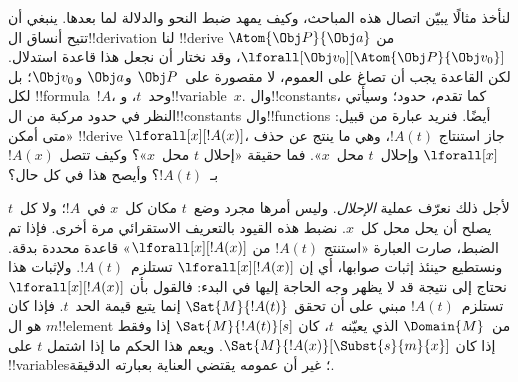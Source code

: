 \documentclass[../../../include/open-logic-section]{subfiles}
\begin{document}


لنأخذ مثالًا يبيّن اتصال هذه المباحث، وكيف يمهد ضبط النحو والدلالة
لما بعدها. ينبغي أن تتيح أنساق ال!!{derivation} لنا
!!{derive} $\Atom{\Obj P}{\Obj a}$ من
$\lforall[\Obj v_0][\Atom{\Obj P}{\Obj v_0}]$، وقد نختار أن
نجعل هذا قاعدة استدلال. لكن القاعدة يجب أن تصاغ على العموم،
لا مقصورة على~$\Obj P$ و$\Obj a$ و$\Obj v_0$؛ بل لكل
!!{formula}~$!A$، وحد~$t$، و!!{variable}~$x$. وال!!{constant}s،
كما تقدم، حدود؛ وسيأتي النظر في حدود مركبة من
ال!!{constant}s وال!!{function}s أيضًا. فنريد عبارة من قبيل:
«متى أمكن !!{derive} $\lforall[x][!A(x)]$، جاز استنتاج
$!A(t)$، وهي ما ينتج عن حذف $\lforall[x]$ وإحلال~$t$
محل~$x$». فما حقيقة «إحلال $t$ محل~$x$»؟ وكيف تتصل
$!A(x)$ بـ~$!A(t)$؟ وأيصح هذا في كل حال؟

لأجل ذلك نعرّف عملية \emph{الإحلال}. وليس أمرها مجرد وضع~$t$
مكان كل~$x$ في~$!A$؛ ولا كل~$t$ يصلح أن يحل محل كل~$x$.
نضبط هذه القيود بالتعريف الاستقرائي مرة أخرى. فإذا تم الضبط،
صارت العبارة «استنتج $!A(t)$ من $\lforall[x][!A(x)]$» قاعدة
محددة بدقة. ونستطيع حينئذ إثبات صوابها، أي إن
$\lforall[x][!A(x)]$ تستلزم~$!A(t)$. ولإثبات هذا نحتاج إلى
نتيجة قد لا يظهر وجه الحاجة إليها في البدء: فالقول بأن
$\lforall[x][!A(x)]$ تستلزم~$!A(t)$ مبني على أن تحقق
$\Sat{M}{!A(t)}$ إنما يتبع قيمة الحد~$t$. فإذا كان $m$
هو ال!!{element} من~$\Domain{M}$ الذي يعيّنه~$t$، كان
$\Sat{M}{!A(t)}[s]$ إذا وفقط إذا كان
$\Sat{M}{!A(x)}[\Subst{s}{m}{x}]$. ويعم هذا الحكم ما إذا
اشتمل $t$ على !!{variable}s؛ غير أن عمومه يقتضي العناية
بعبارته الدقيقة.
\end{document}
